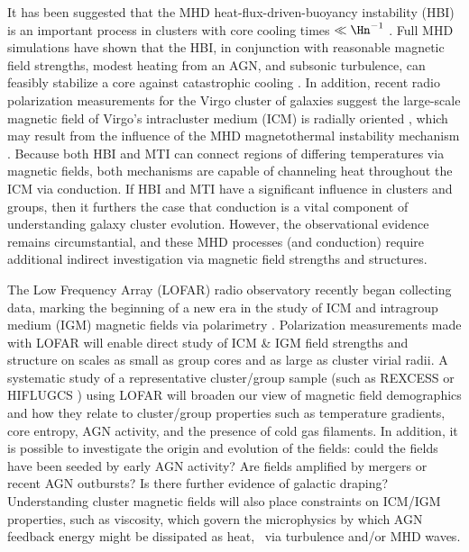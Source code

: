 \documentclass[11pt]{article}
\begin{document}
It has been suggested that the MHD heat-flux-driven-buoyancy
instability (HBI) is an important process in clusters with core
cooling times $\ll \Hn^{-1}$ \cite{2008ApJ...677L...9P}. Full MHD
simulations have shown that the HBI, in conjunction with reasonable
magnetic field strengths, modest heating from an AGN, and subsonic
turbulence, can feasibly stabilize a core against catastrophic cooling
\cite{2009ApJ...703...96P, 2009arXiv0911.5198R}. In addition, recent
radio polarization measurements for the Virgo cluster of galaxies
suggest the large-scale magnetic field of Virgo's intracluster medium
(ICM) is radially oriented \cite{2009arXiv0911.2476P}, which may
result from the influence of the MHD magnetothermal instability
mechanism \cite[MTI,][]{2000ApJ...534..420B}. Because both HBI and MTI
can connect regions of differing temperatures via magnetic fields,
both mechanisms are capable of channeling heat throughout the ICM via
conduction. If HBI and MTI have a significant influence in clusters
and groups, then it furthers the case that conduction is a vital
component of understanding galaxy cluster evolution. However, the
observational evidence remains circumstantial, and these MHD processes
(and conduction) require additional indirect investigation via
magnetic field strengths and structures.

The Low Frequency Array (LOFAR) radio observatory recently began
collecting data, marking the beginning of a new era in the study of
ICM and intragroup medium (IGM) magnetic fields via polarimetry
\cite{2009ASPC..407...33A}. Polarization measurements made with LOFAR
will enable direct study of ICM \& IGM field strengths and structure
on scales as small as group cores and as large as cluster virial
radii. A systematic study of a representative cluster/group sample
(such as REXCESS \cite{rexcess} or HIFLUGCS \cite{hiflugcs1}) using
LOFAR will broaden our view of magnetic field demographics and how
they relate to cluster/group properties such as temperature gradients,
core entropy, AGN activity, and the presence of cold gas filaments. In
addition, it is possible to investigate the origin and evolution of
the fields: could the fields have been seeded by early AGN activity?
Are fields amplified by mergers or recent AGN outbursts? Is there
further evidence of galactic draping?  Understanding cluster magnetic
fields will also place constraints on ICM/IGM properties, such as
viscosity, which govern the microphysics by which AGN feedback energy
might be dissipated as heat, \eg\ via turbulence and/or MHD waves.
\end{document}
